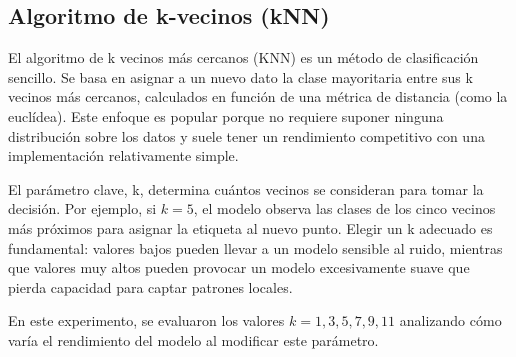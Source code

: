 \documentclass[a4paper,10pt]{article}
\begin{document}
    
    
    
    
    \newpage
    \subsection{Algoritmo de k-vecinos (kNN)}
    El algoritmo de k vecinos más cercanos (KNN) es un método de clasificación sencillo. Se basa en asignar a un nuevo dato la clase mayoritaria entre sus k vecinos más cercanos, calculados en función de una métrica de distancia (como la euclídea). Este enfoque es popular porque no requiere suponer ninguna distribución sobre los datos y suele tener un rendimiento competitivo con una implementación relativamente simple. 
    
    El parámetro clave, k, determina cuántos vecinos se consideran para tomar la decisión. Por ejemplo, si $k=5$, el modelo observa las clases de los cinco vecinos más próximos para asignar la etiqueta al nuevo punto. Elegir un k adecuado es fundamental: valores bajos pueden llevar a un modelo sensible al ruido, mientras que valores muy altos pueden provocar un modelo excesivamente suave que pierda capacidad para captar patrones locales. 
    
    En este experimento, se evaluaron los valores $k=1, 3, 5, 7, 9, 11$ analizando cómo varía el rendimiento del modelo al modificar este parámetro.
    
\end{document}
